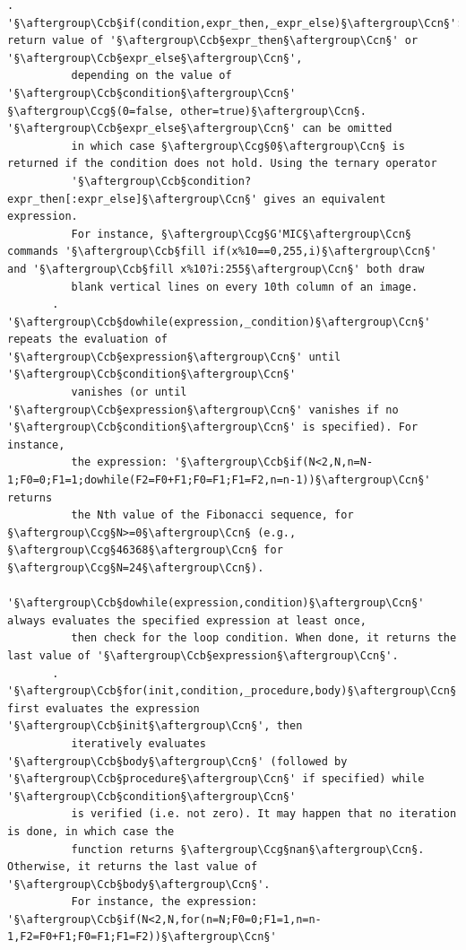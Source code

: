 \documentclass[a4paper,10.5pt,twoside]{book}
\def\Ccb{\color{cb}}
\def\Ccg{\color{cc}}
\def\Ccn{\color{black}}
\begin{document}
\begin{lstlisting}[escapechar=§]
       . '§\aftergroup\Ccb§if(condition,expr_then,_expr_else)§\aftergroup\Ccn§': return value of '§\aftergroup\Ccb§expr_then§\aftergroup\Ccn§' or '§\aftergroup\Ccb§expr_else§\aftergroup\Ccn§', 
          depending on the value of '§\aftergroup\Ccb§condition§\aftergroup\Ccn§' §\aftergroup\Ccg§(0=false, other=true)§\aftergroup\Ccn§. '§\aftergroup\Ccb§expr_else§\aftergroup\Ccn§' can be omitted 
          in which case §\aftergroup\Ccg§0§\aftergroup\Ccn§ is returned if the condition does not hold. Using the ternary operator 
          '§\aftergroup\Ccb§condition?expr_then[:expr_else]§\aftergroup\Ccn§' gives an equivalent expression. 
          For instance, §\aftergroup\Ccg§G'MIC§\aftergroup\Ccn§ commands '§\aftergroup\Ccb§fill if(x%10==0,255,i)§\aftergroup\Ccn§' and '§\aftergroup\Ccb§fill x%10?i:255§\aftergroup\Ccn§' both draw 
          blank vertical lines on every 10th column of an image. 
       . '§\aftergroup\Ccb§dowhile(expression,_condition)§\aftergroup\Ccn§' repeats the evaluation of '§\aftergroup\Ccb§expression§\aftergroup\Ccn§' until '§\aftergroup\Ccb§condition§\aftergroup\Ccn§' 
          vanishes (or until '§\aftergroup\Ccb§expression§\aftergroup\Ccn§' vanishes if no '§\aftergroup\Ccb§condition§\aftergroup\Ccn§' is specified). For instance, 
          the expression: '§\aftergroup\Ccb§if(N<2,N,n=N-1;F0=0;F1=1;dowhile(F2=F0+F1;F0=F1;F1=F2,n=n-1))§\aftergroup\Ccn§' returns 
          the Nth value of the Fibonacci sequence, for §\aftergroup\Ccg§N>=0§\aftergroup\Ccn§ (e.g., §\aftergroup\Ccg§46368§\aftergroup\Ccn§ for §\aftergroup\Ccg§N=24§\aftergroup\Ccn§). 
          '§\aftergroup\Ccb§dowhile(expression,condition)§\aftergroup\Ccn§' always evaluates the specified expression at least once, 
          then check for the loop condition. When done, it returns the last value of '§\aftergroup\Ccb§expression§\aftergroup\Ccn§'. 
       . '§\aftergroup\Ccb§for(init,condition,_procedure,body)§\aftergroup\Ccn§' first evaluates the expression '§\aftergroup\Ccb§init§\aftergroup\Ccn§', then 
          iteratively evaluates '§\aftergroup\Ccb§body§\aftergroup\Ccn§' (followed by '§\aftergroup\Ccb§procedure§\aftergroup\Ccn§' if specified) while '§\aftergroup\Ccb§condition§\aftergroup\Ccn§' 
          is verified (i.e. not zero). It may happen that no iteration is done, in which case the 
          function returns §\aftergroup\Ccg§nan§\aftergroup\Ccn§. Otherwise, it returns the last value of '§\aftergroup\Ccb§body§\aftergroup\Ccn§'. 
          For instance, the expression: '§\aftergroup\Ccb§if(N<2,N,for(n=N;F0=0;F1=1,n=n-1,F2=F0+F1;F0=F1;F1=F2))§\aftergroup\Ccn§' 

\end{lstlisting}
\end{document}
